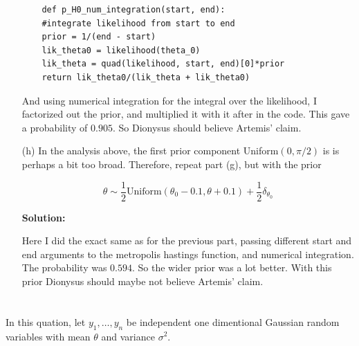 \documentclass{article}
\begin{document}
\begin{enumerate}
\begin{verbatim}
    def p_H0_num_integration(start, end):
    #integrate likelihood from start to end
    prior = 1/(end - start)
    lik_theta0 = likelihood(theta_0)
    lik_theta = quad(likelihood, start, end)[0]*prior
    return lik_theta0/(lik_theta + lik_theta0)
\end{verbatim}

And using numerical integration for the integral over the likelihood, I factorized out the prior, and multiplied it with it after in the code.
This gave a probability of $0.905$. So Dionysus should believe Artemis' claim.


\item[(h)] In the analysis above, the first prior component Uniform$(0, \pi/2)$ is is perhaps
a bit too broad. Therefore, repeat part (g), but with the prior

\[
\theta \sim \frac{1}{2} \text{Uniform} (\theta_0 - 0.1, \theta + 0.1) + \frac{1}{2} \delta_{\theta_0}
\]

\textbf{Solution:}
\par
Here I did the exact same as for the previous part, passing different start and end arguments
to the metropolis hastings function, and numerical integration. The probability was $0.594$. So the wider prior
was a lot better. With this prior Dionysus should maybe not believe Artemis' claim.
\end{enumerate}
    

\section{} 
In this quation, let $y_1, \dots, y_n$ be independent one dimentional Gaussian random variables with mean $\theta$ and variance $\sigma^2$. 
\end{document}
